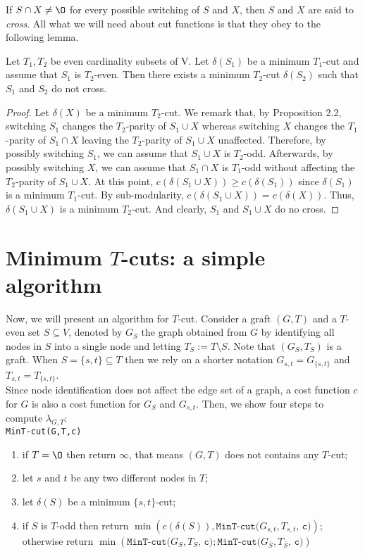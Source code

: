 If $S \cap X \neq \O$ for every possible switching of $S$ and $X$, then $S$ and $X$ are said to \emph{cross}. All what we will need about cut functions is that they obey to the following lemma. 

\begin{lemma}
Let $T_{1}, T_{2}$ be even cardinality subsets of V. Let $\delta(S_1)$ be a minimum $T_1$-cut and assume that $S_1$ is $T_2$-even. Then there exists a minimum $T_2$-cut $\delta(S_2)$ such that $S_1$ and $S_2$ do not cross.
\end{lemma}

\begin{proof}
Let $\delta(X)$ be a minimum $T_2$-cut. We remark that, by Proposition 2.2, switching $S_1$ changes the $T_2$-parity of $S_1 \cup X$ whereas switching $X$ changes the $T_1$-parity of $S_1 \cap X$ leaving the $T_2$-parity of $S_1 \cup X$ unaffected. Therefore, by possibly switching $S_1$, we can assume that $S_1 \cup X$ is $T_2$-odd. Afterwards, by possibly switching $X$, we can assume that $S_1 \cap X$ is $T_1$-odd without affecting the $T_2$-parity of $S_1 \cup X$. 
At this point, $c(\delta(S_1 \cup X)) \ge c(\delta(S_1))$ since $\delta(S_1)$ is a minimum $T_1$-cut. By sub-modularity, $c(\delta(S_1 \cup X)) = c(\delta(X))$. Thus, $\delta(S_1 \cup X)$ is a minimum $T_2$-cut. And clearly, $S_1$ and $S_1 \cup X$ do no cross. 
\end{proof}

\section{Minimum $T$-cuts: a simple algorithm}
Now, we will present an algorithm for $T$-cut. Consider a graft $(G,T)$ and a $T$-even set $S \subseteq V$, denoted by $G_S$ the graph obtained from $G$ by identifying all nodes in $S$ into a single node and letting $T_S := T \setminus S$. Note that $(G_S, T_S)$ is a graft. When $S = \{ s, t \} \subseteq T$ then we rely on a shorter notation $G_{s,t} = G_{\{s,t\}}$ and $T_{s,t} = T_{\{s,t\}}$. \\
Since node identification does not affect the edge set of a graph, a cost function $c$ for $G$ is also a cost function for $G_S$ and $G_{s,t}$.
Then, we show four steps to compute $\lambda_{G,T}$:\\

\texttt{MinT-cut(G,T,c)}
\begin{enumerate}
\item if $T = \O$ then return $\infty$, that means $(G,T)$ does not contains any $T$-cut;\\
\item let $s$ and $t$ be any two different nodes in $T$; \\
\item let $\delta(S)$ be a minimum $\{s,t\}$-cut; \\
\item if $S$ is $T$-odd then return $\min( c(\delta(S)), \texttt{MinT-cut($G_{s,t}, T_{s,t}$, c)})$; otherwise return $\min(\texttt{MinT-cut($G_{S}, T_{S}$, c)}; \texttt{MinT-cut($G_{\bar{S}}, T_{\bar{S}}$, c)})$
\end{enumerate}

